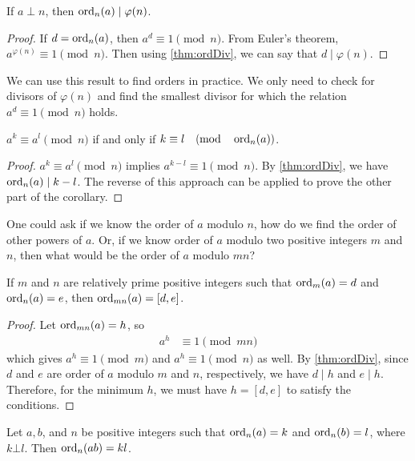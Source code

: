 \documentclass{subfile}
\begin{document}
	\begin{corollary}\label{cor:phiDiv}
		If $a\perp n$, then $\operatorname{ord}_n(a)\mid \varphi (n)$.
	\end{corollary}

	\begin{proof}
		If $d=\operatorname{ord}_n(a)$, then $a^d\equiv1\pmod n$. From Euler's theorem, $a^{\varphi (n)}\equiv1\pmod n$. Then using \autoref{thm:ordDiv}, we can say that $d\mid \varphi (n)$.
	\end{proof}
We can use this result to find orders in practice. We only need to check for divisors of $\varphi(n)$ and find the smallest divisor for which the relation $a^d\equiv1\pmod n$ holds.
	\begin{corollary}
		$a^k\equiv a^l\pmod n$ if and only if $k\equiv l\pmod{\ord_n(a)}$.
	\end{corollary}

	\begin{proof}
		$a^k\equiv a^l\pmod n$ implies $a^{k-l} \equiv 1 \pmod n$. By \autoref{thm:ordDiv}, we have $\operatorname{ord}_n(a) \mid  k-l$. The reverse of this approach can be applied to prove the other part of the corollary.
	\end{proof}
One could ask if we know the order of $a$ modulo $n$, how do we find the order of other powers of $a$. Or, if we know order of $a$ modulo two positive integers $m$ and $n$, then what would be the order of $a$ modulo $mn$?
	\begin{theorem}
		If $m$ and $n$ are relatively prime positive integers such that $\operatorname{ord}_m(a)=d$ and $\operatorname{ord}_n(a)=e$, then $\operatorname{ord}_{mn}(a)=[d,e]$.\label{thm:ordL}
	\end{theorem}

	\begin{proof}
		Let $\operatorname{ord}_{mn}(a)=h$, so
			\begin{align*}
				a^h
					& \equiv1\pmod {mn}
			\end{align*}
		which gives $a^h\equiv1\pmod m$ and $a^h\equiv1\pmod n$ as well. By \autoref{thm:ordDiv}, since $d$ and $e$ are order of $a$ modulo $m$ and $n$, respectively, we have $d\mid h$ and $e\mid h$. Therefore, for the minimum $h$, we must have $h=[d,e]$ to satisfy the conditions.
	\end{proof}

	\begin{theorem}\label{thm:prproduct}
		Let $a,b$, and $n$ be positive integers such that $\operatorname{ord}_n(a)=k$ and $\operatorname{ord}_n(b)=l$, where $k\bot l$. Then $\operatorname{ord}_n(ab)=kl$.
	\end{theorem}
\end{document}

